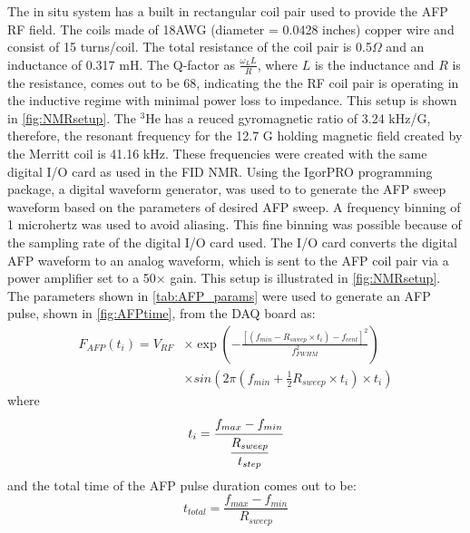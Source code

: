 The in situ system has a built in rectangular coil pair used to provide the AFP RF field. The coils made of 18AWG (diameter = 0.0428 inches) copper wire and consist of 15 turns/coil. The total resistance of the coil pair is 0.5$\Omega$ and an inductance of 0.317 mH. The Q-factor as $\frac{\omega_L L}{R}$, where $L$ is the inductance and $R$ is the resistance, comes out to be 68, indicating the the RF coil pair is operating in the inductive regime with minimal power loss to impedance. This setup is shown in \cref{fig:NMRsetup}. The $^3$He has a reuced gyromagnetic ratio of 3.24 kHz/G, therefore, the resonant frequency for the 12.7 G holding magnetic field created by the Merritt coil is 41.16 kHz. These frequencies were created  with the same digital I/O card as used in the FID NMR. Using the IgorPRO programming package, a digital waveform generator, was used to to generate the AFP sweep waveform based on the parameters of desired AFP sweep. A frequency binning of 1 microhertz was used to avoid aliasing. This fine binning was possible because of the sampling rate of the digital I/O card used. The I/O card converts the digital AFP waveform to an analog waveform, which is sent to the AFP coil pair via a power amplifier set to a 50$\times$ gain. This setup is illustrated in \cref{fig:NMRsetup}. The parameters shown in \cref{tab:AFP_params} were used to generate an AFP pulse, shown in \cref{fig:AFPtime}, from the DAQ board as:
\begin{equation}
 \begin{aligned}
    F_{AFP}(t_i)  = V_{RF} & \times \exp\left( -\frac{ \left[\left(f_{min}-R_{sweep} \times t_i \right)- f_{cent} \right]^2 }{f_{FWHM}^2}    \right) \\
    & \times sin \left(2 \pi \left(f_{min} + \frac{1}{2} R_{sweep} \times t_i \right) \times t_i \right)
\end{aligned}   
\end{equation}
where
\begin{equation}
    t_i = \cfrac{f_{max}-f_{min}}{\cfrac{R_{sweep}}{t_{step}}}
\end{equation}
and the total time of the AFP pulse duration comes out to be:
\begin{equation}
    t_{total} = \frac{f_{max}-f_{min}}{R_{sweep}}
\end{equation}

